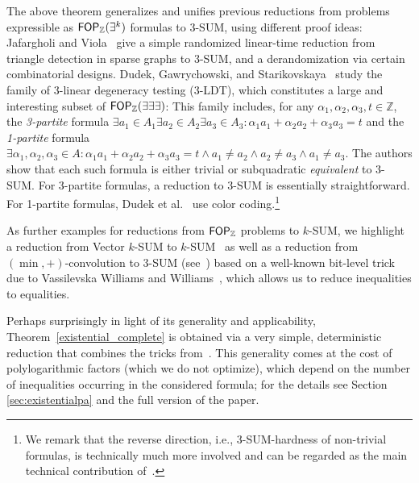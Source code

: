 The above theorem generalizes and unifies previous reductions from problems expressible as $\mathsf{FOP}_{\mathbb{Z}}(\exists^k)$ formulas to 3-SUM, using different proof ideas: Jafargholi and Viola~\cite[Lemma 4]{DBLP:journals/algorithmica/JafargholiV16} give a simple randomized linear-time reduction from triangle detection in sparse graphs to 3-SUM, and a derandomization via certain combinatorial designs.
Dudek, Gawrychowski, and Starikovskaya~\cite{DBLP:conf/stoc/0001GS20} study the family of 3-linear degeneracy testing (3-LDT), which constitutes a large and interesting subset of $\mathsf{FOP}_{\mathbb{Z}}(\exists \exists \exists)$: This family includes, for any $\alpha_1,\alpha_2,\alpha_3, t\in \mathbb{Z}$, the \emph{3-partite} formula $\exists a_1 \in A_1 \exists a_2\in A_2 \exists a_3\in A_3: \alpha_1 a_1 + \alpha_2 a_2 + \alpha_3 a_3 = t$ and the \emph{1-partite} formula $\exists \alpha_1, \alpha_2, \alpha_3 \in A: \alpha_1 a_1 + \alpha_2 a_2 + \alpha_3 a_3 = t \wedge a_1\ne a_2 \wedge a_2\ne a_3 \wedge a_1\ne a_3$.
The authors show that each such formula is either trivial or subquadratic \emph{equivalent} to $3$-SUM.
For 3-partite formulas, a reduction to $3$-SUM is essentially straightforward.
For 1-partite formulas, Dudek et al.~\cite{DBLP:conf/stoc/0001GS20} use color coding.\footnote{We remark that the reverse direction, i.e., $3$-SUM-hardness of non-trivial formulas, is technically much more involved and can be regarded as the main technical contribution of~\cite{DBLP:conf/stoc/0001GS20}.} %

As further examples for reductions from $\mathsf{FOP}_{\mathbb{Z}}$ problems to $k$-SUM, we highlight a reduction from Vector $k$-SUM to $k$-SUM~\cite{DBLP:journals/corr/AbboudLW13} as well as a reduction from $(\min,+)$-convolution to $3$-SUM (see~\cite{BackursIS17,DBLP:journals/talg/CyganMWW19}) based on a well-known bit-level trick due to Vassilevska Williams and Williams~\cite{DBLP:journals/siamcomp/WilliamsW13}, which allows us to reduce inequalities to equalities. 

Perhaps surprisingly in light of its generality and applicability, Theorem~\ref{existential_complete} is obtained via a very simple, deterministic reduction that combines the tricks from~\cite{DBLP:journals/corr/AbboudLW13,DBLP:journals/siamcomp/WilliamsW13}. This generality comes at the cost of polylogarithmic factors (which we do not optimize), which depend on the number of inequalities occurring in the considered formula; for the details see Section \ref{sec:existentialpa} and the full version of the paper.






